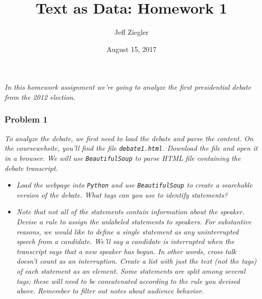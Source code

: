 \documentclass[12pt,letterpaper]{article}
\title{Text as Data: Homework 1}
\date{August 15, 2017}
\author{Jeff Ziegler}
\begin{document}
\maketitle

\noindent \textit{In this homework assignment we're going to analyze the first presidential debate from the 2012 election.}  \\

\subsubsection*{Problem 1}
\textit{To analyze the debate, we first need to load the debate and parse the content.  On the coursewebsite, you'll find the file {\tt debate1.html}.  Download the file and open it in a browser. We will use {\tt BeautifulSoup} to parse HTML file containing the debate transcript.}

\begin{itemize}
\item \textit{Load the webpage into {\tt Python} and use {\tt BeautifulSoup} to create a searchable version of the debate. What tags can you use to identify statements?}



\item \textit{Note that not all of the statements contain information about the speaker. Devise a rule to assign the unlabeled statements to speakers. For substantive reasons, we would like to define a single statement as any \textit{uninterrupted} speech from a candidate. We'll say a candidate is interrupted when the transcript says that a new speaker has begun.  In other words, cross talk doesn't count as an interruption. Create a list with just the text (not the tags) of each statement as an element. Some statements are split among several tags; these will need to be concatenated according to the rule you devised above. Remember to filter out notes about audience behavior.}



\end{itemize}
\end{document}
